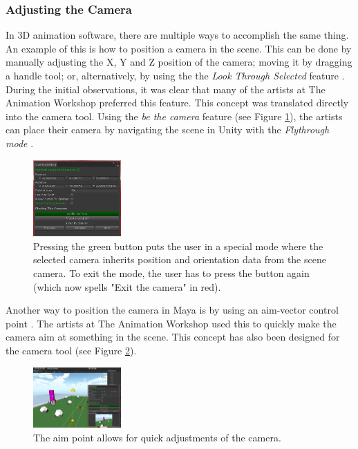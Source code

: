 \subsubsection{Adjusting the Camera}
In 3D animation software, there are multiple ways to accomplish the same thing. An example of this is how to position a camera in the scene. This can be done by manually adjusting the X, Y and Z position of the camera; moving it by dragging a handle tool; or, alternatively, by using the the \textit{Look Through Selected} feature \cite{maya_lookThrough}. During the initial observations, it was clear that many of the artists at The Animation Workshop preferred this feature. This concept was translated directly into the camera tool. Using the \textit{be the camera} feature (see Figure \ref{fig:beTheCam}), the artists can place their camera by navigating the scene in Unity with the \textit{Flythrough mode} \cite{unity_flyMode}.

\begin{figure}[htbp]
\centering
\includegraphics[width=0.3\textwidth]{Pics/be_the_cam_new}
\caption{Pressing the green button puts the user in a special mode where the selected camera inherits position and orientation data from the scene camera. To exit the mode, the user has to press the button again (which now spells "Exit the camera" in red).}
\label{fig:beTheCam}
\end{figure}

Another way to position the camera in Maya is by using an aim-vector control point \cite{maya_camAim}. The artists at The Animation Workshop used this to quickly make the camera aim at something in the scene. This concept has also been designed for the camera tool (see Figure \ref{fig:aimPoint}).

\begin{figure}[htbp]
\centering
\includegraphics[width=0.3\textwidth]{Pics/aimPoint}
\caption{The aim point allows for quick adjustments of the camera.}
\label{fig:aimPoint}
\end{figure}


